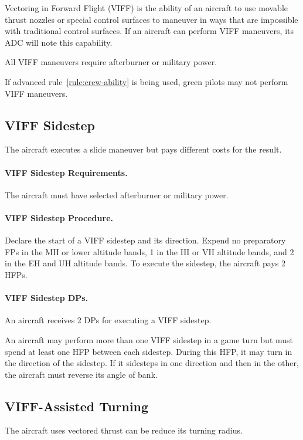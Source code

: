 \begin{advancedrules}
{}{

Vectoring in Forward Flight (VIFF) is the ability of an aircraft to use movable thrust nozzles or special control surfaces to maneuver in ways that are impossible with traditional control surfaces. If an aircraft can perform VIFF maneuvers, its ADC will note this capability.

All VIFF maneuvers require afterburner or military power.

If advanced rule~\ref{rule:crew-ability} is being used, green pilots may not perform VIFF maneuvers.

\subsection{VIFF Sidestep}

The aircraft executes a slide maneuver but pays different costs for the result.

\paragraph{VIFF Sidestep Requirements.} The aircraft must have selected afterburner or military power.

\paragraph{VIFF Sidestep Procedure.} Declare the start of a VIFF sidestep and its direction. Expend no preparatory FPs in the MH or lower altitude bands, 1 in the HI or VH altitude bands, and 2 in the EH and UH altitude bands. To execute the sidestep, the aircraft pays 2 HFPs.

\paragraph{VIFF Sidestep DPs.} An aircraft receives 2 DPs for executing a VIFF sidestep.

An aircraft may perform more than one VIFF sidestep in a game turn but must spend at least one HFP between each sidestep. During this HFP, it may turn in the direction of the sidestep. If it sidesteps in one direction and then in the other, the aircraft must reverse its angle of bank.

\subsection{VIFF-Assisted Turning}

The aircraft uses vectored thrust can be reduce its turning radius. 

}
\end{advancedrules}
